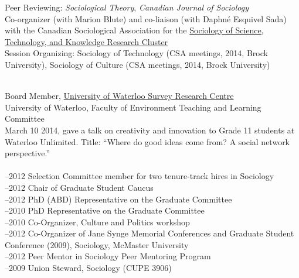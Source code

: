 \documentclass[11pt,usenames,dvipsnames]{article}
\begin{document}

\bigskip


\noindent Peer Reviewing: {\it Sociological Theory}, {\it Canadian Journal of Sociology}\\

\noindent Co-organizer (with Marion Blute) and co-liaison (with Daphné Esquivel Sada) with the Canadian Sociological Association for the \href{http://www.csa-scs.ca/files/webapps/csapress/sstk/}{Sociology of Science, Technology, and Knowledge Research Cluster}\\

\noindent Session Organizing: Sociology of Technology (CSA meetings, 2014, Brock University), Sociology of Culture (CSA meetings, 2014, Brock University) \\


 \\
 Board Member, \href{http://math.uwaterloo.ca/survey-research-centre/node/1}{University of Waterloo Survey Research Centre}  \\

 University of Waterloo, Faculty of Environment Teaching and Learning Committee \\

\noindent March 10 2014, gave a talk on creativity and innovation to Grade 11 students at Waterloo Unlimited. Title: ``Where do good ideas come from? A social network perspective.'' \\

\\
–2012 Selection Committee member for two tenure-track hires in Sociology\\
–2012 Chair of Graduate Student Caucus\\
–2012 PhD (ABD) Representative on the Graduate Committee\\
–2010 PhD Representative on the Graduate Committee\\
–2010 Co-Organizer, Culture and Politics workshop\\
–2012 Co-Organizer of Jane Synge Memorial Conferences and Graduate Student Conference (2009), Sociology, McMaster University\\
–2012 Peer Mentor in Sociology Peer Mentoring Program\\
–2009 Union Steward, Sociology (CUPE 3906)\\
\end{document}
